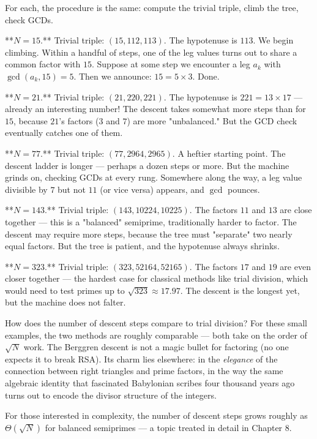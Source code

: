 \documentclass[12pt, letterpaper, openany]{book}
\theoremstyle{definition}
\theoremstyle{remark}
\begin{document}
For each, the procedure is the same: compute the trivial triple, climb the tree, check GCDs.

**$N = 15$.**
Trivial triple: $(15, 112, 113)$. The hypotenuse is $113$. We begin climbing. Within a handful of steps, one of the leg values turns out to share a common factor with $15$. Suppose at some step we encounter a leg $a_k$ with $\gcd(a_k, 15) = 5$. Then we announce: $15 = 5 \times 3$. Done.

**$N = 21$.**
Trivial triple: $(21, 220, 221)$. The hypotenuse is $221 = 13 \times 17$ --- already an interesting number! The descent takes somewhat more steps than for $15$, because $21$'s factors ($3$ and $7$) are more "unbalanced." But the GCD check eventually catches one of them.

**$N = 77$.**
Trivial triple: $(77, 2964, 2965)$. A heftier starting point. The descent ladder is longer --- perhaps a dozen steps or more. But the machine grinds on, checking GCDs at every rung. Somewhere along the way, a leg value divisible by $7$ but not $11$ (or vice versa) appears, and $\gcd$ pounces.

**$N = 143$.**
Trivial triple: $(143, 10224, 10225)$. The factors $11$ and $13$ are close together --- this is a "balanced" semiprime, traditionally harder to factor. The descent may require more steps, because the tree must "separate" two nearly equal factors. But the tree is patient, and the hypotenuse always shrinks.

**$N = 323$.**
Trivial triple: $(323, 52164, 52165)$. The factors $17$ and $19$ are even closer together --- the hardest case for classical methods like trial division, which would need to test primes up to $\sqrt{323} \approx 17.97$. The descent is the longest yet, but the machine does not falter.

How does the number of descent steps compare to trial division? For these small examples, the two methods are roughly comparable --- both take on the order of $\sqrt{N}$ work. The Berggren descent is not a magic bullet for factoring (no one expects it to break RSA). Its charm lies elsewhere: in the \textit{elegance} of the connection between right triangles and prime factors, in the way the same algebraic identity that fascinated Babylonian scribes four thousand years ago turns out to encode the divisor structure of the integers.

For those interested in complexity, the number of descent steps grows roughly as $\Theta(\sqrt{N})$ for balanced semiprimes --- a topic treated in detail in Chapter 8.
\end{document}

